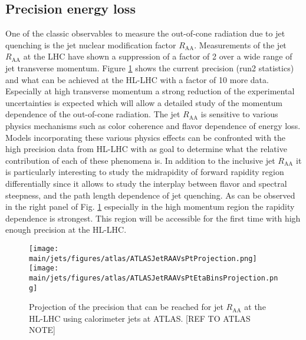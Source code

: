 \subsection{Precision energy loss}
One of the classic observables to measure the out-of-cone radiation due to jet quenching is the jet nuclear modification factor $R_{\mathrm{AA}}$. Measurements of the jet $R_{\mathrm{AA}}$ at the LHC have shown a suppression of a factor of 2 over a wide range of jet transverse momentum. Figure \ref{fig:jetRAA} shows the current precision (run2 statistics) and what can be achieved at the HL-LHC with a factor of 10 more data. Especially at high transverse momentum a strong reduction of the experimental uncertainties is expected which will allow a detailed study of the momentum dependence of the out-of-cone radiation. The jet $R_{\mathrm{AA}}$ is sensitive to various physics mechanisms such as color coherence and flavor dependence of energy loss. Models incorporating these various physics effects can be confronted with the high precision data from HL-LHC with as goal to determine what the relative contribution of each of these phenomena is. In addition to the inclusive jet $R_{\mathrm{AA}}$ it is particularly interesting to study the midrapidity of forward rapidity region differentially since it allows to study the interplay between flavor and spectral steepness, and the path length dependence of jet quenching. As can be observed in the right panel of Fig. \ref{fig:jetRAA} especially in the high momentum region the rapidity dependence is strongest. This region will be accessible for the first time with high enough precision at the HL-LHC.
\begin{figure}[!ht]
\begin{center}
\texttt{[image: \\main/jets/figures/atlas/ATLASJetRAAVsPtProjection.png]}
\texttt{[image: \\main/jets/figures/atlas/ATLASJetRAAVsPtEtaBinsProjection.png]}
\caption{Projection of the precision that can be reached for jet $R_{\mathrm{AA}}$ at the HL-LHC using calorimeter jets at ATLAS. [REF TO ATLAS NOTE]}
\label{fig:jetRAA}
\end{center}
\end{figure}


